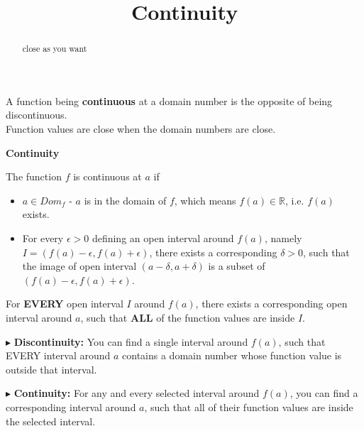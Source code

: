 \documentclass{ximera}
\title{Continuity}
\begin{document}
\begin{abstract}
close as you want
\end{abstract}
\maketitle






A function being \textbf{continuous} at a domain number is the opposite of being discontinuous. \\


Function values are close when the domain numbers are close.










\begin{definition} \textbf{\textcolor{green!50!black}{Continuity}}

The function $f$ is continuous at $a$ if


\begin{itemize}
\item $a \in Dom_f$ - $a$ is in the domain of $f$, which means $f(a) \in \mathbb{R}$, i.e. $f(a)$ exists.
\item For every $\epsilon > 0$ defining an open interval around $f(a)$, namely $I = (f(a) - \epsilon, f(a) + \epsilon)$, there exists a corresponding $\delta > 0$, such that the image of open interval $(a - \delta, a + \delta)$ is a subset of $(f(a)-\epsilon, f(a)+\epsilon)$.
\end{itemize}


For \textbf{\textcolor{red!80!black}{EVERY}} open interval $I$ around $f(a)$, there exists a corresponding open interval around $a$, such that \textbf{\textcolor{red!80!black}{ALL}} of the function values are inside $I$.


\end{definition}





$\blacktriangleright$ \textbf{Discontinuity:}  You can find a single interval around $f(a)$, such that EVERY interval around $a$ contains a domain number whose function value is outside that interval.


$\blacktriangleright$ \textbf{Continuity:} For any and every selected interval around $f(a)$, you can find a corresponding interval around $a$, such that all of their function values are inside the selected interval.
\end{document}
